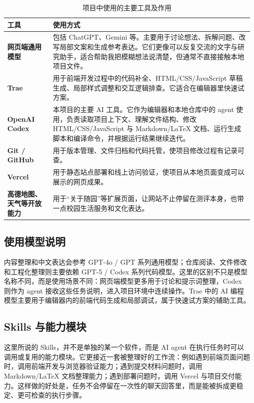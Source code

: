 \documentclass[UTF8,zihao=-4]{ctexart}
\begin{document}
\begin{table}[H]
  \centering
  \caption{项目中使用的主要工具及作用}
  \renewcommand{\arraystretch}{1.35}
  \setlength{\extrarowheight}{3pt}
  \begin{tabularx}{\textwidth}{>{\raggedright\arraybackslash\bfseries}p{3.6cm}>{\raggedright\arraybackslash}X}
    \toprule
    工具 & 使用方式 \\
    \midrule
    网页端通用模型 & 包括 ChatGPT、Gemini 等。主要用于讨论想法、拆解问题、改写局部文案和生成参考表达。它们更像可以反复交流的文字与研究助手，适合帮助我把模糊想法说清楚，但通常不直接接触本地项目文件。 \\
    Trae & 用于前端开发过程中的代码补全、HTML/CSS/JavaScript 草稿生成、局部样式调整和交互逻辑排查。它适合在编辑器里快速试方案。 \\
    OpenAI Codex & 本项目的主要 AI 工具。它作为编辑器和本地仓库中的 agent 使用，负责读取项目上下文、理解文件结构、修改 HTML/CSS/JavaScript 与 Markdown/LaTeX 文档、运行生成脚本和编译命令，并根据运行结果继续迭代。 \\
    Git / GitHub & 用于版本管理、文件归档和代码托管，使项目修改过程有记录可查。 \\
    Vercel & 用于静态站点部署和线上访问验证，使项目从本地页面变成可以展示的网页成果。 \\
    高德地图、天气等开放能力 & 用于“关于随园”等扩展页面，让网站不止停留在测评本身，也带一点校园生活服务和文化表达。 \\
    \bottomrule
  \end{tabularx}
\end{table}

\subsection{使用模型说明}

内容整理和中文表达会参考 GPT-4o / GPT 系列通用模型；仓库阅读、文件修改和工程化整理则主要依赖 GPT-5 / Codex 系列代码模型。这里的区别不只是模型名称不同，而是使用场景不同：网页端模型更多用于讨论和提示词整理，Codex 则作为 agent 接收这些任务说明，进入项目环境中连续操作。Trae 中的 AI 编程模型主要用于编辑器内的前端代码生成和局部调试，属于快速试方案的辅助工具。

\subsection{Skills 与能力模块}

这里所说的 Skills，并不是单独的某一个软件，而是 AI agent 在执行任务时可以调用或复用的能力模块。它更接近一套被整理好的工作流：例如遇到前端页面问题时，调用前端开发与浏览器验证能力；遇到提交材料问题时，调用 Markdown/LaTeX 文档整理能力；遇到部署问题时，调用 Vercel 与项目交付能力。这样做的好处是，任务不会停留在一次性的聊天回答里，而是能被拆成更稳定、更可检查的执行步骤。
\end{document}

